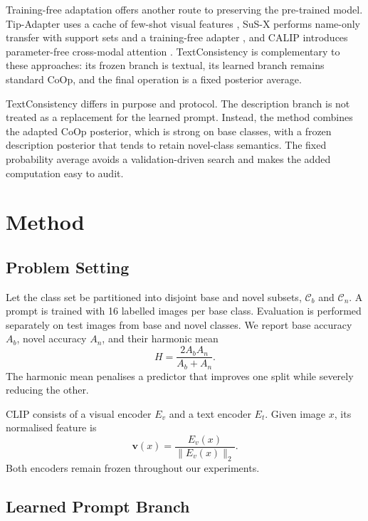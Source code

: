 \documentclass[preprint,12pt]{elsarticle}
\begin{document}
Training-free adaptation offers another route to preserving the pre-trained model. Tip-Adapter uses a cache of few-shot visual features \cite{zhang2022tipadapter}, SuS-X performs name-only transfer with support sets and a training-free adapter \cite{udandarao2023susx}, and CALIP introduces parameter-free cross-modal attention \cite{guo2023calip}. TextConsistency is complementary to these approaches: its frozen branch is textual, its learned branch remains standard CoOp, and the final operation is a fixed posterior average.

TextConsistency differs in purpose and protocol. The description branch is not treated as a replacement for the learned prompt. Instead, the method combines the adapted CoOp posterior, which is strong on base classes, with a frozen description posterior that tends to retain novel-class semantics. The fixed probability average avoids a validation-driven search and makes the added computation easy to audit.

\section{Method}
\label{sec:method}

\subsection{Problem Setting}

Let the class set be partitioned into disjoint base and novel subsets, $\mathcal{C}_{b}$ and $\mathcal{C}_{n}$. A prompt is trained with 16 labelled images per base class. Evaluation is performed separately on test images from base and novel classes. We report base accuracy $A_b$, novel accuracy $A_n$, and their harmonic mean
\begin{equation}
H = \frac{2A_bA_n}{A_b+A_n}.
\label{eq:hm}
\end{equation}
The harmonic mean penalises a predictor that improves one split while severely reducing the other.

CLIP consists of a visual encoder $E_v$ and a text encoder $E_t$. Given image $x$, its normalised feature is
\begin{equation}
\mathbf{v}(x)=\frac{E_v(x)}{\|E_v(x)\|_2}.
\end{equation}
Both encoders remain frozen throughout our experiments.

\subsection{Learned Prompt Branch}
\end{document}
